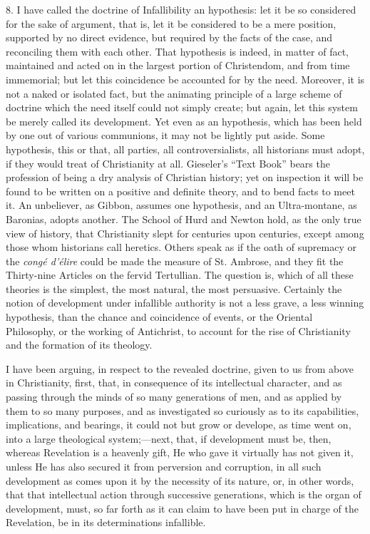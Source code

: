 8. I have called the doctrine of Infallibility an
hypothesis: let it be so considered for the sake of
argument, that is, let it be considered to be a mere
position, supported by no direct evidence, but required
by the facts of the case, and reconciling them with each
other. That hypothesis is indeed, in matter of fact,
maintained and acted on in the largest portion of
Christendom, and from time immemorial; but let this
coincidence be accounted for by the need. Moreover, it is
not a naked or isolated fact, but the animating principle
of a large scheme of doctrine which the need itself could
not simply create; but again, let this system be merely
called its development. Yet even as an hypothesis, which
has been held by one out of various communions, it may
not be lightly put aside. Some hypothesis, this or that,
all parties, all controversialists, all historians must
adopt, if they would treat of Christianity at all.
Gieseler's ``Text Book'' bears the profession of
being a dry analysis of Christian history; yet on
inspection it will be found to be written on a positive
and definite theory, and to bend facts to meet it. An
unbeliever, as Gibbon, assumes one hypothesis, and an
Ultra-montane, as Baronias, adopts another. The School of
Hurd and Newton hold, as the only true view of history,
that Christianity slept for centuries upon centuries,
except among those whom historians call heretics. Others
speak as if the oath of supremacy or the \emph{congé
d'élire} could be made the measure of St. Ambrose,
and they fit the Thirty-nine Articles on the fervid
Tertullian. The question is, which of all these theories
is the simplest, the most natural, the most persuasive.
Certainly the notion of development under infallible
authority is not a less grave, a less winning hypothesis,
than the chance and coincidence of events, or the
Oriental Philosophy, or the working of Antichrist, to
account for the rise of Christianity and the formation of
its theology.


I have been arguing, in respect to the revealed
doctrine, given to us from above in Christianity, first,
that, in consequence of its intellectual character, and
as passing through the minds of so many generations of
men, and as applied by them to so many purposes, and as
investigated so curiously as to its capabilities,
implications, and bearings, it could not but grow or
develope, as time went on, into a large theological
system;—next, that, if development must be, then,
whereas Revelation is a heavenly gift, He who gave it
virtually has not given it, unless He has also secured it
from perversion and corruption, in all such development
as comes upon it by the necessity of its nature, or, in
other words, that that intellectual action through
successive generations, which is the organ of
development, must, so far forth as it can claim to have
been put in charge of the Revelation, be in its
determinations infallible.

